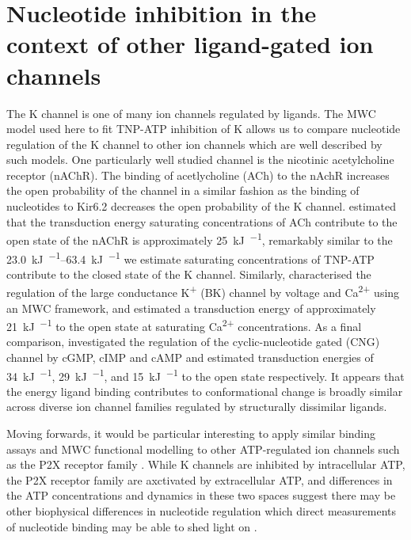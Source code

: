 \section{Nucleotide inhibition in the context of other ligand-gated ion channels}

The K\ATP{} channel is one of many ion channels regulated by ligands.
The MWC model used here to fit TNP-ATP inhibition of K\ATP{} allows us to compare nucleotide regulation of the K\ATP{} channel to other ion channels which are well described by such models.
One particularly well studied channel is the nicotinic acetylcholine receptor (nAChR).
The binding of acetlycholine (ACh) to the nAchR increases the open probability of the channel in a similar fashion as the binding of nucleotides to Kir6.2 decreases the open probability of the K\ATP{} channel.
\textcite{auerbach_thinking_2012} estimated that the transduction energy saturating concentrations of ACh contribute to the open state of the nAChR is approximately \SI{25}{\kilo\joule\per\Molar}, remarkably similar to the \SIrange{23.0}{63.4}{\kilo\joule\per\Molar} we estimate saturating concentrations of TNP-ATP contribute to the closed state of the K\ATP{} channel.
Similarly, \textcite{horrigan_coupling_2002} characterised the regulation of the large conductance K\textsuperscript{+} (BK) channel by voltage and Ca\textsuperscript{2+} using an MWC framework, and estimated a transduction energy of approximately \SI{21}{\kilo\joule\per\Molar} to the open state at saturating Ca\textsuperscript{2+} concentrations.
As a final comparison, \textcite{varnum_subunit_1996} investigated the regulation of the cyclic-nucleotide gated (CNG) channel by cGMP, cIMP and cAMP and estimated transduction energies of \SI{34}{\kilo\joule\per\Molar}, \SI{29}{\kilo\joule\per\Molar}, and \SI{15}{\kilo\joule\per\Molar} to the open state respectively.
It appears that the energy ligand binding contributes to conformational change is broadly similar across diverse ion channel families regulated by structurally dissimilar ligands.

Moving forwards, it would be particular interesting to apply similar binding assays and MWC functional modelling to other ATP-regulated ion channels such as the P2X receptor family \cite{khakh_p2x_2006}.
While K\ATP{} channels are inhibited by intracellular ATP, the P2X receptor family are axctivated by extracellular ATP, and differences in the ATP concentrations and dynamics in these two spaces suggest there may be other biophysical differences in nucleotide regulation which direct measurements of nucleotide binding may be able to shed light on \cite{mansoor_x-ray_2016}.
